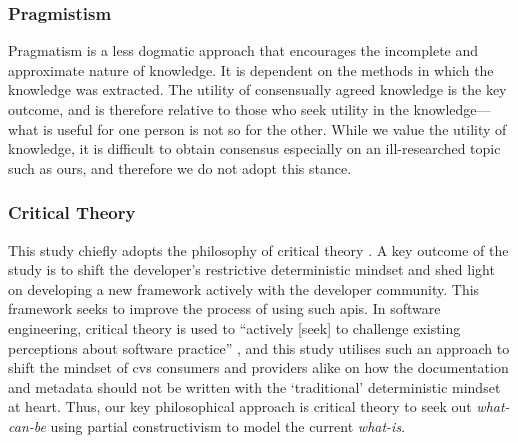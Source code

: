 \subsubsection*{Pragmistism}
Pragmatism is a less dogmatic approach that encourages the incomplete and approximate nature of knowledge. It is dependent on the methods in which the knowledge was extracted. The utility of consensually agreed knowledge is the key outcome, and is therefore relative to those who seek utility in the knowledge---what is useful for one person is not so for the other. While we value the utility of knowledge, it is difficult to obtain consensus especially on an ill-researched topic such as ours, and therefore we do not adopt this stance.

\subsubsection*{Critical Theory}
This study chiefly adopts the philosophy of critical theory \citep{Calhoun:1995ww}. A key outcome of the study is to shift the developer's restrictive deterministic mindset and shed light on developing a new framework actively with the developer community. This framework seeks to improve the process of using such \glspl{api}. In software engineering, critical theory is used to ``actively [seek] to challenge existing perceptions about software practice'' \citep{Easterbrook:2007ws}, and this study utilises such an approach to shift the mindset of \gls{cvs} consumers and providers alike on how the documentation and metadata should not be written with the `traditional' deterministic mindset at heart. Thus, our key philosophical approach is critical theory to seek out \textit{what-can-be} using  partial constructivism to model the current \textit{what-is}.
